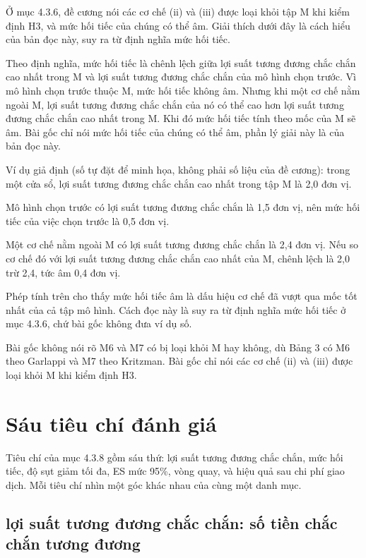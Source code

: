 Ở mục 4.3.6, đề cương nói các cơ chế (ii) và (iii) được loại khỏi tập M khi kiểm định H3, và mức hối tiếc của chúng có thể âm. Giải thích dưới đây là cách hiểu của bản đọc này, suy ra từ định nghĩa mức hối tiếc.

Theo định nghĩa, mức hối tiếc là chênh lệch giữa lợi suất tương đương chắc chắn cao nhất trong M và lợi suất tương đương chắc chắn của mô hình chọn trước. Vì mô hình chọn trước thuộc M, mức hối tiếc không âm. Nhưng khi một cơ chế nằm ngoài M, lợi suất tương đương chắc chắn của nó có thể cao hơn lợi suất tương đương chắc chắn cao nhất trong M. Khi đó mức hối tiếc tính theo mốc của M sẽ âm. Bài gốc chỉ nói mức hối tiếc của chúng có thể âm, phần lý giải này là của bản đọc này.

\begin{tcolorbox}[breakable]
Ví dụ giả định (số tự đặt để minh họa, không phải số liệu của đề cương): trong một cửa sổ, lợi suất tương đương chắc chắn cao nhất trong tập M là 2,0 đơn vị.

Mô hình chọn trước có lợi suất tương đương chắc chắn là 1,5 đơn vị, nên mức hối tiếc của việc chọn trước là 0,5 đơn vị.

Một cơ chế nằm ngoài M có lợi suất tương đương chắc chắn là 2,4 đơn vị. Nếu so cơ chế đó với lợi suất tương đương chắc chắn cao nhất của M, chênh lệch là 2,0 trừ 2,4, tức âm 0,4 đơn vị.
\end{tcolorbox}

Phép tính trên cho thấy mức hối tiếc âm là dấu hiệu cơ chế đã vượt qua mốc tốt nhất của cả tập mô hình. Cách đọc này là suy ra từ định nghĩa mức hối tiếc ở mục 4.3.6, chứ bài gốc không đưa ví dụ số.

Bài gốc không nói rõ M6 và M7 có bị loại khỏi M hay không, dù Bảng 3 có M6 theo Garlappi và M7 theo Kritzman. Bài gốc chỉ nói các cơ chế (ii) và (iii) được loại khỏi M khi kiểm định H3.

\section{Sáu tiêu chí đánh giá}

Tiêu chí của mục 4.3.8 gồm sáu thứ: lợi suất tương đương chắc chắn, mức hối tiếc, độ sụt giảm tối đa, ES mức 95\%, vòng quay, và hiệu quả sau chi phí giao dịch. Mỗi tiêu chí nhìn một góc khác nhau của cùng một danh mục.

\subsection{lợi suất tương đương chắc chắn: số tiền chắc chắn tương đương}

